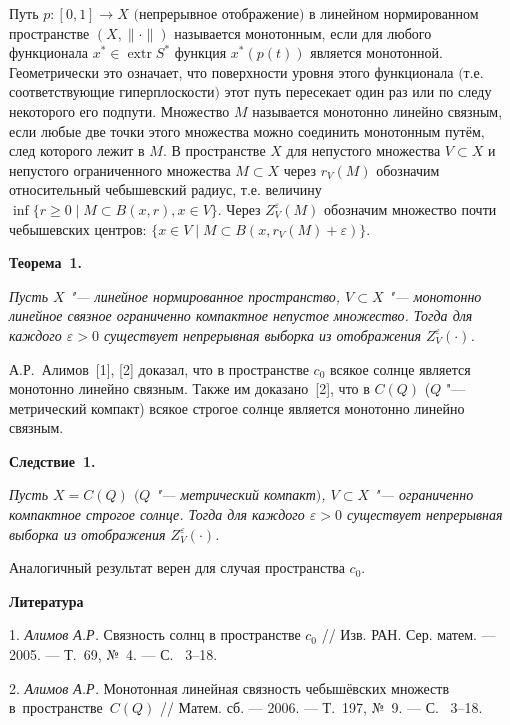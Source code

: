 \vzmscaption


Путь $p:[0,1]\rightarrow X$ $($непрерывное
отображение$)$ в линейном нормированном пространстве
$(X,\|\cdot\|)$ называется монотонным, если для любого функционала
$x^*\in\operatorname{extr}S^*$ функция $x^*(p(t))$ является
монотонной. Геометрически это означает, что поверхности уровня этого функционала $($т.е.
соответствующие гиперплоскости$)$ этот путь пересекает один раз или
по следу некоторого его подпути.
Множество $M$ называется монотонно линейно связным, если любые
две точки этого множества можно соединить монотонным путём, след
которого лежит в $M.$
В пространстве $X$ для непустого множества $V\subset X$ и непустого ограниченного множества $M\subset X$ через $r_V(M)$ обозначим относительный чебышевский радиус, т.е. величину $\inf\{r\geqslant 0\mid M\subset B(x,r), x\in V\}$. Через
 $Z_V^\varepsilon (M)$ обозначим множество почти чебышевских центров: $ \{x\in V\mid M\subset B(x,r_V(M)+\varepsilon)\}$.


\textbf{Теорема~1.} {\it Пусть $X$ "--- линейное нормированное пространство, $V\subset X$ "--- монотонно линейное связное ограниченно компактное непустое множество. Тогда для каждого $\varepsilon>0$ существует непрерывная выборка из отображения $Z_V^\varepsilon(\cdot)$.


}


А.Р.~Алимов~[1], [2] доказал, что в пространстве $c_0$ всякое солнце является монотонно линейно связным. Также им доказано~[2], что в $C(Q)$ ($Q$ "--- метрический компакт) всякое строгое солнце является монотонно линейно связным.




\textbf{Следствие~1.} {\it Пусть $X=C(Q) $ $(Q$ "--- метрический компакт$)$, $V\subset X$ "--- ограниченно компактное строгое солнце. Тогда для каждого $\varepsilon>0$ существует непрерывная выборка из отображения $Z_V^\varepsilon(\cdot)$.

}

Аналогичный результат верен для случая пространства $c_0$.

\smallskip \centerline {\bf Литература} \nopagebreak


1. {\it Алимов А.Р.} Связность солнц в пространстве $c_0$ // Изв. РАН. Сер. матем.
--- 2005. ---
Т.~69,
№~4. --- С.~ 3--18.

2. {\it Алимов А.Р.} Монотонная линейная связность
чебышёвских множеств в~пространстве~$C(Q)$ // Матем. сб.
--- 2006. ---
Т.~197,
№~9. --- С.~ 3--18.
